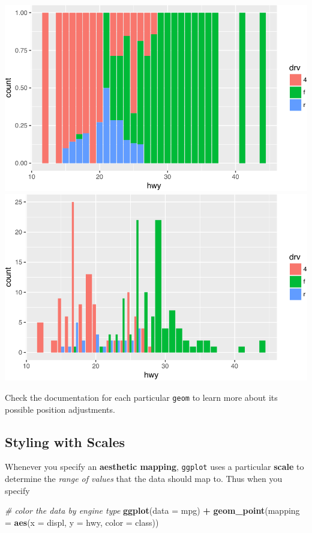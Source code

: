 \documentclass[]{book}
\newenvironment{Shaded}{\begin{snugshade}}{\end{snugshade}}
\newcommand{\KeywordTok}[1]{\textcolor[rgb]{0.13,0.29,0.53}{\textbf{#1}}}
\newcommand{\DataTypeTok}[1]{\textcolor[rgb]{0.13,0.29,0.53}{#1}}
\newcommand{\StringTok}[1]{\textcolor[rgb]{0.31,0.60,0.02}{#1}}
\newcommand{\CommentTok}[1]{\textcolor[rgb]{0.56,0.35,0.01}{\textit{#1}}}
\newcommand{\OperatorTok}[1]{\textcolor[rgb]{0.81,0.36,0.00}{\textbf{#1}}}
\newcommand{\NormalTok}[1]{#1}
\theoremstyle{definition}
\theoremstyle{definition}
\theoremstyle{remark}
\begin{document}
\includegraphics[width=380pt]{img/ggplot2/position_examples-1}
\includegraphics[width=380pt]{img/ggplot2/position_examples-2}

Check the documentation for each particular \texttt{geom} to learn more
about its possible position adjustments.

\subsection{Styling with Scales}\label{styling-with-scales}

Whenever you specify an \textbf{aesthetic mapping}, \texttt{ggplot} uses
a particular \textbf{scale} to determine the \emph{range of values} that
the data should map to. Thus when you specify

\begin{Shaded}
\begin{Highlighting}[]
\CommentTok{# color the data by engine type}
\KeywordTok{ggplot}\NormalTok{(}\DataTypeTok{data =}\NormalTok{ mpg) }\OperatorTok{+}
\StringTok{  }\KeywordTok{geom_point}\NormalTok{(}\DataTypeTok{mapping =} \KeywordTok{aes}\NormalTok{(}\DataTypeTok{x =}\NormalTok{ displ, }\DataTypeTok{y =}\NormalTok{ hwy, }\DataTypeTok{color =}\NormalTok{ class))}
\end{Highlighting}
\end{Shaded}
\end{document}
